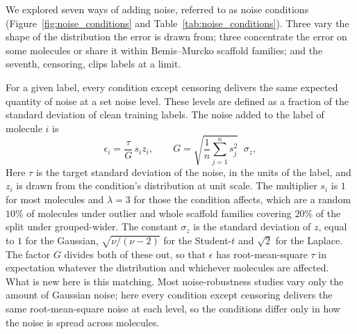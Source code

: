 We explored seven ways of adding noise, referred to as noise conditions (Figure~\ref{fig:noise_conditions} and Table~\ref{tab:noise_conditions}). Three vary the shape of the distribution the error is drawn from; three concentrate the error on some molecules or share it within Bemis--Murcko scaffold families; and the seventh, censoring, clips labels at a limit.

For a given label, every condition except censoring delivers the same expected quantity of noise at a set noise level. These levels are defined as a fraction of the standard deviation of clean training labels. The noise added to the label of molecule $i$ is
\begin{equation}
\epsilon_i = \frac{\tau}{G}\,s_i z_i,
\qquad
G = \sqrt{\frac{1}{n}\sum_{j=1}^{n} s_j^{2}}\;\;\sigma_z,
\label{eq:dose_matching}
\end{equation}
Here $\tau$ is the target standard deviation of the noise, in the units of the label, and $z_i$ is
drawn from the condition's distribution at unit scale. The multiplier $s_i$ is $1$ for most
molecules and $\lambda = 3$ for those the condition affects, which are a random $10\%$ of molecules
under outlier and whole scaffold families covering $20\%$ of the split under grouped-wider. The
constant $\sigma_z$ is the standard deviation of $z$, equal to $1$ for the Gaussian,
$\sqrt{\nu/(\nu-2)}$ for the Student-$t$ and $\sqrt{2}$ for the Laplace. The factor $G$ divides both
of these out, so that $\epsilon$ has root-mean-square $\tau$ in expectation whatever the
distribution and whichever molecules are affected. What is new here is this matching. Most noise-robustness studies vary only the amount of Gaussian noise; here every condition except censoring delivers the same root-mean-square noise at each level, so the conditions differ only in how the noise is spread across molecules. %

